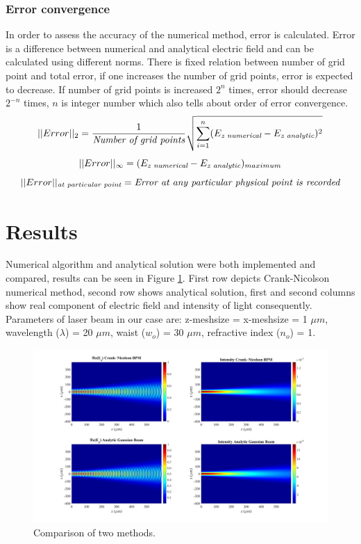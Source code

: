 \documentclass[a4paper]{article}
\begin{document}
	\subsubsection{Error convergence}	
	In order to assess the accuracy of the numerical method, error is calculated. Error is a difference between numerical and analytical electric field and can be calculated using different norms. There is fixed relation between number of grid point and total error, if one increases the number of grid points, error is expected to decrease. If number of grid points is increased $2^n$ times, error should decrease $2^{-n}$ times, $n$ is integer number which also tells about order of error convergence.
	\[||Error||_2 = \frac{1}{\text{{\it Number of grid points}}}\sqrt{\sum\limits_{i=1}^n (E_{\text{\it z numerical}}-E_{\text{\it z analytic}})^2 }
	\]
	\[
	||Error||_\infty = (E_{\text{\it z numerical}}-E_{\text{\it z analytic}})_{maximum}
	\]
	\[ ||Error||_{\text{\it at particular point}} = \text{\it Error at any particular physical point is recorded}
	\]
	\newpage
	\section{Results}
	Numerical algorithm and analytical solution were both implemented and compared, results can be seen in Figure \ref{fig:Results}. First row depicts Crank-Nicolson numerical method, second row shows analytical solution, first and second columns show real component of electric field and intensity of light consequently. Parameters of laser beam in our case are: z-meshsize = x-meshsize  = 1 $\mu m$, wavelength ($\lambda$) = 20 $\mu m$, waist ($w_o$) = 30 $\mu m$, refractive index ($n_o$) = 1.	
	\begin{figure}[h!]
		\hspace{-30mm}
		\includegraphics[width=1.5\textwidth]{N1.jpg}
		\caption{\label{fig:Results}Comparison of two methods.}
	\end{figure}
\end{document}
